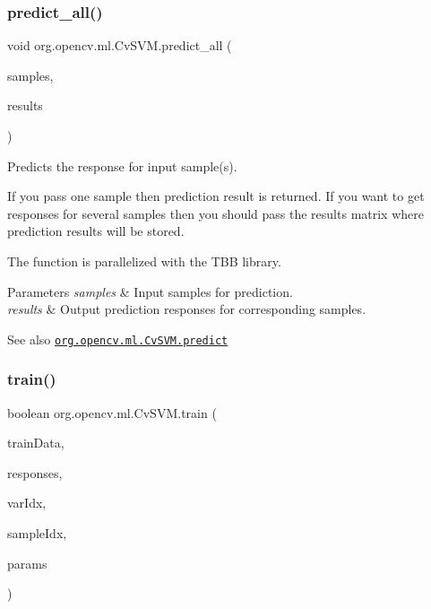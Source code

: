 \subsubsection{\texorpdfstring{predict\+\_\+all()}{predict\_all()}}
{\footnotesize\ttfamily void org.\+opencv.\+ml.\+Cv\+S\+V\+M.\+predict\+\_\+all (\begin{DoxyParamCaption}\item[{\mbox{\hyperlink{classorg_1_1opencv_1_1core_1_1_mat}{Mat}}}]{samples,  }\item[{\mbox{\hyperlink{classorg_1_1opencv_1_1core_1_1_mat}{Mat}}}]{results }\end{DoxyParamCaption})}

Predicts the response for input sample(s).

If you pass one sample then prediction result is returned. If you want to get responses for several samples then you should pass the {\ttfamily results} matrix where prediction results will be stored.

The function is parallelized with the T\+BB library.


\begin{DoxyParams}{Parameters}
{\em samples} & Input samples for prediction. \\
\hline
{\em results} & Output prediction responses for corresponding samples.\\
\hline
\end{DoxyParams}
\begin{DoxySeeAlso}{See also}
\href{http://docs.opencv.org/modules/ml/doc/support_vector_machines.html#cvsvm-predict}{\tt org.\+opencv.\+ml.\+Cv\+S\+V\+M.\+predict} 
\end{DoxySeeAlso}
\mbox{\label{classorg_1_1opencv_1_1ml_1_1_cv_s_v_m_af61821e7066a0d6fed7a24c858ec61a8}} 
\subsubsection{\texorpdfstring{train()}{train()}\hspace{0.1cm}{\footnotesize\ttfamily [1/2]}}
{\footnotesize\ttfamily boolean org.\+opencv.\+ml.\+Cv\+S\+V\+M.\+train (\begin{DoxyParamCaption}\item[{\mbox{\hyperlink{classorg_1_1opencv_1_1core_1_1_mat}{Mat}}}]{train\+Data,  }\item[{\mbox{\hyperlink{classorg_1_1opencv_1_1core_1_1_mat}{Mat}}}]{responses,  }\item[{\mbox{\hyperlink{classorg_1_1opencv_1_1core_1_1_mat}{Mat}}}]{var\+Idx,  }\item[{\mbox{\hyperlink{classorg_1_1opencv_1_1core_1_1_mat}{Mat}}}]{sample\+Idx,  }\item[{\mbox{\hyperlink{classorg_1_1opencv_1_1ml_1_1_cv_s_v_m_params}{Cv\+S\+V\+M\+Params}}}]{params }\end{DoxyParamCaption})}

